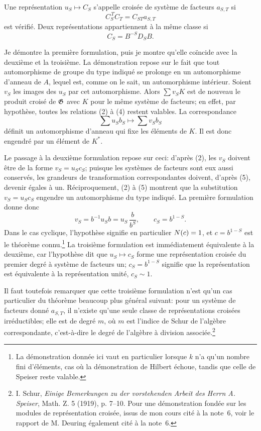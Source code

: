 Une représentation \(u_S\mapsto C_S\) s'appelle croisée de système de facteurs \(a_{S,T}\) si
\[
        C_S^{\,T}C_T=C_{ST}a_{S,T}
\]
est vérifié. Deux représentations appartiennent à la même classe si
\[
        C_S=B^{-S}D_SB .
\]

Je démontre la première formulation, puis je montre qu'elle coïncide avec la deuxième et la troisième. La démonstration repose sur le fait que tout automorphisme de groupe du type indiqué se prolonge en un automorphisme d'anneau de \(A\), lequel est, comme on le sait, un automorphisme intérieur. Soient \(v_S\) les images des \(u_S\) par cet automorphisme. Alors \(\sum v_SK\) est de nouveau le produit croisé de \(\mathfrak G\) avec \(K\) pour le même système de facteurs; en effet, par hypothèse, toutes les relations (2) à (4) restent valables. La correspondance
\[
        \sum u_Sb_S\longmapsto \sum v_Sb_S
\]
définit un automorphisme d'anneau qui fixe les éléments de \(K\). Il est donc engendré par un élément de \(K^*\).

Le passage à la deuxième formulation repose sur ceci: d'après (2), les \(v_S\) doivent être de la forme \(v_S=u_Sc_S\); puisque les systèmes de facteurs sont eux aussi conservés, les grandeurs de transformation correspondantes doivent, d'après (5), devenir égales à un. Réciproquement, (2) à (5) montrent que la substitution \(v_S=u_Sc_S\) engendre un automorphisme du type indiqué. La première formulation donne donc
\[
        v_S=b^{-1}u_Sb=u_S\,\frac{b}{b^S},
        \qquad c_S=b^{1-S}.
\]
Dans le cas cyclique, l'hypothèse signifie en particulier \(N(c)=1\), et \(c=b^{1-S}\) est le théorème connu.\footnote{La démonstration donnée ici vaut en particulier lorsque \(k\) n'a qu'un nombre fini d'éléments, cas où la démonstration de Hilbert échoue, tandis que celle de Speiser reste valable.} La troisième formulation est immédiatement équivalente à la deuxième, car l'hypothèse dit que \(u_S\mapsto c_S\) forme une représentation croisée du premier degré à système de facteurs un; \(c_S=b^{1-S}\) signifie que la représentation est équivalente à la représentation unité, \(c_S\sim1\).

Il faut toutefois remarquer que cette troisième formulation n'est qu'un cas particulier du théorème beaucoup plus général suivant: pour un système de facteurs donné \(a_{S,T}\), il n'existe qu'une seule classe de représentations croisées irréductibles; elle est de degré \(m\), où \(m\) est l'indice de Schur de l'algèbre correspondante, c'est-à-dire le degré de l'algèbre à division associée.\footnote{I. Schur, \emph{Einige Bemerkungen zu der vorstehenden Arbeit des Herrn A. Speiser}, Math. Z. 5 (1919), p. 7--10. Pour une démonstration fondée sur les modules de représentation croisée, issus de mon cours cité à la note~6, voir le rapport de M. Deuring également cité à la note~6.}

